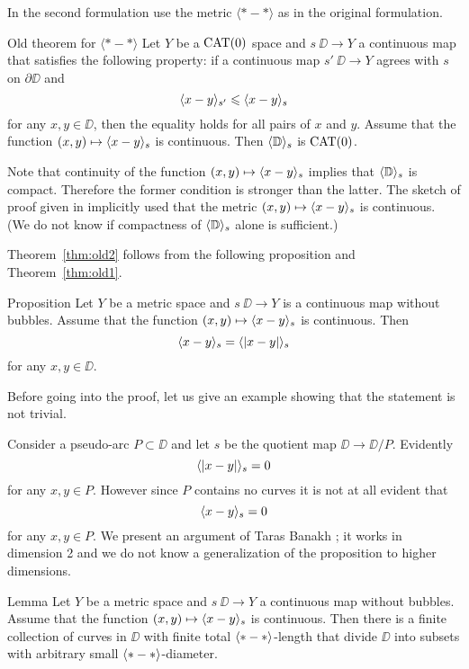 In the second formulation use the metric $\langle{*}-{*}\rangle$ as in the original formulation.

\begin{thm}{Old theorem for $\bm{\langle{*}-{*}\rangle}$}\label{thm:old2}
Let $Y$ be a $\mathop{\rm CAT}\nolimits(0)$ space and $s\:\DD\to Y$ a continuous map that satisfies the following property: 
if a continuous map $s'\:\DD\to Y$ agrees with $s$ on $\partial\DD$ and
\[\langle x-y\rangle_{s'}\leqslant \langle x-y\rangle_{s}\]
for any $x,y\in \DD$,
then the equality holds for all pairs of $x$ and $y$.
Assume that the function $(x,y)\mapsto\langle x-y\rangle_{s}$ is continuous.
Then $\langle\mathbb{D}\rangle_s$ is $\mathop{\rm CAT}\nolimits(0)$.
\end{thm}

Note that continuity of the function $(x,y)\mapsto\langle x-y\rangle_{s}$
implies that $\langle\mathbb{D}\rangle_s$ is compact.
Therefore the former condition is stronger than the latter.  
The sketch of proof given in \cite{petrunin-metric-min} implicitly used that the metric $(x,y)\zz\mapsto\<x-y\>_{s}$ is continuous.
(We do not know if compactness of $\langle\mathbb{D}\rangle_s$ alone is sufficient.)

Theorem~\ref{thm:old2} follows from the following proposition and Theorem~\ref{thm:old1}.
 
\begin{thm}{Proposition}\label{prop:<||>=<>}
Let $Y$ be a metric space and $s\:\DD\to Y$ is a continuous map without bubbles.
Assume that the function $(x,y)\mapsto \langle x-y\rangle_s$ is continuous.
Then 
\[\langle x-y\rangle_s=\langle|x-y|\rangle_s\]
for any $x,y\in \DD$.
\end{thm}

Before going into the proof, let us give an example showing that the statement is not trivial.

Consider a pseudo-arc $P\subset \DD$ and let $s$ be the quotient map $\DD\to \DD/P$.
Evidently 
\[\langle|x-y|\rangle_s=0\]
for any $x,y\in P$.
However since $P$ contains no curves it is not at all evident that 
\[\langle x-y\rangle_s=0\]
for any $x,y\in P$.
We present an argument of Taras Banakh \cite{banakh};
it works in dimension 2 and we do not know a generalization of the proposition to higher dimensions.

\begin{thm}{Lemma}\label{lem:subdivision}
Let $Y$ be a metric space and $s\:\DD\to Y$ a continuous map without bubbles.
Assume that the function $(x,y)\mapsto \langle x-y\rangle_s$ is continuous.
Then there is a finite collection of curves in $\DD$ with finite total $\langle{*}-{*}\rangle$-length 
that divide $\DD$ into subsets with arbitrary small $\langle{*}-{*}\rangle$-diameter.
\end{thm}

